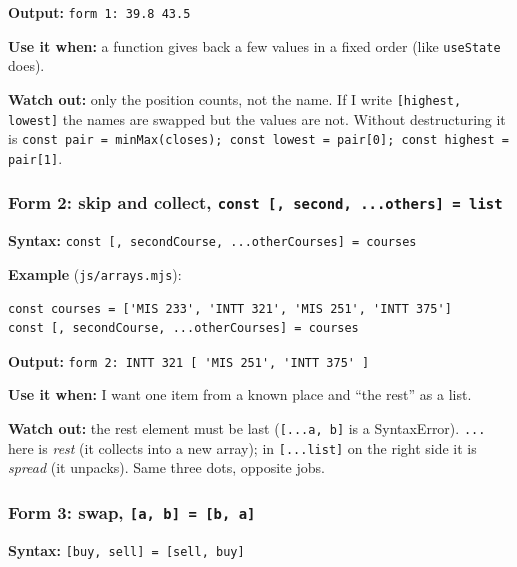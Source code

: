 \documentclass[
  11pt,
]{article}
\newcommand{\passthrough}[1]{#1}
\begin{document}
\textbf{Output:} \passthrough{\lstinline!form 1: 39.8 43.5!}

\textbf{Use it when:} a function gives back a few values in a fixed
order (like \passthrough{\lstinline!useState!} does).

\textbf{Watch out:} only the position counts, not the name. If I write
\passthrough{\lstinline![highest, lowest]!} the names are swapped but
the values are not. Without destructuring it is
\passthrough{\lstinline!const pair = minMax(closes); const lowest = pair[0]; const highest = pair[1]!}.

\subsubsection{\texorpdfstring{Form 2: skip and collect,
\texttt{const\ {[},\ second,\ ...others{]}\ =\ list}}{Form 2: skip and collect, const {[}, second, ...others{]} = list}}\label{form-2-skip-and-collect-const-second-...others-list}

\textbf{Syntax:}
\passthrough{\lstinline!const [, secondCourse, ...otherCourses] = courses!}

\textbf{Example} (\passthrough{\lstinline!js/arrays.mjs!}):

\begin{lstlisting}
const courses = ['MIS 233', 'INTT 321', 'MIS 251', 'INTT 375']
const [, secondCourse, ...otherCourses] = courses
\end{lstlisting}

\textbf{Output:}
\passthrough{\lstinline!form 2: INTT 321 [ 'MIS 251', 'INTT 375' ]!}

\textbf{Use it when:} I want one item from a known place and ``the
rest'' as a list.

\textbf{Watch out:} the rest element must be last
(\passthrough{\lstinline![...a, b]!} is a SyntaxError).
\passthrough{\lstinline!...!} here is \emph{rest} (it collects into a
new array); in \passthrough{\lstinline![...list]!} on the right side it
is \emph{spread} (it unpacks). Same three dots, opposite jobs.

\subsubsection{\texorpdfstring{Form 3: swap,
\texttt{{[}a,\ b{]}\ =\ {[}b,\ a{]}}}{Form 3: swap, {[}a, b{]} = {[}b, a{]}}}\label{form-3-swap-a-b-b-a}

\textbf{Syntax:} \passthrough{\lstinline![buy, sell] = [sell, buy]!}
\end{document}
